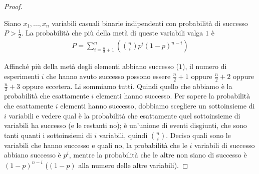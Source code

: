 \begin{proof}
\begin{definition}
Siano $x_1, ..., x_n$ variabili casuali binarie indipendenti con probabilità di successo $P > \frac{1}{2}$. La probabilità che più della metà di queste variabili valga $1$ è
\begin{align*}
    P = \sum^n_{i = \frac{n}{2}+1}\left(\binom{n}{i}p^i(1-p)^{n-i} \right)
\end{align*}
\end{definition}

\noindent Affinché più della metà degli elementi abbiano successo ($1$), il numero di esperimenti $i$ che hanno avuto successo possono essere $\frac{n}{2}+1$ oppure $\frac{n}{2}+2$ oppure $\frac{n}{2}+3$ oppure eccetera. Li sommiamo tutti. Quindi quello che abbiamo è la probabilità che esattamente $i$ elementi hanno successo. Per sapere la probabilità che esattamente $i$ elementi hanno successo, dobbiamo scegliere un sottoinsieme di $i$ variabili e vedere qual è la probabilità che esattamente quel sottoinsieme di variabili ha successo (e le restanti no); è un'unione di eventi disgiunti, che sono tanti quanti i sottoinsiemi di $i$ variabili, quindi $\binom{n}{i}$. Deciso quali sono le variabili che hanno successo e quali no, la probabilità che le $i$ variabili di successo abbiano successo è $p^i$, mentre la probabilità che le altre non siano di successo è $(1-p)^{n-i}$ ($(1-p)$ alla numero delle altre variabili).


\end{proof}
